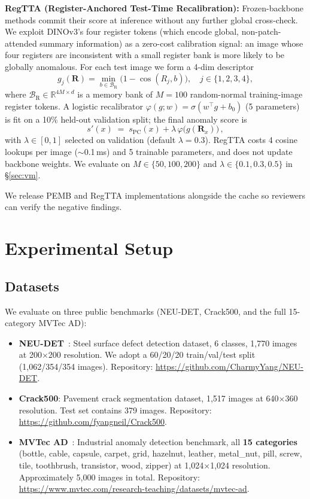 \documentclass[journal]{IEEEtran}
\begin{document}
\textbf{RegTTA (Register-Anchored Test-Time Recalibration):} Frozen-backbone methods commit their score at inference without any further global cross-check. We exploit DINOv3's four register tokens (which encode global, non-patch-attended summary information) as a zero-cost calibration signal: an image whose four registers are inconsistent with a small register bank is more likely to be globally anomalous. For each test image we form a 4-dim descriptor
\begin{equation}
g_j(\mathbf{R}) = \min_{b \in \mathcal{B}_{\mathrm{R}}} \bigl(1 - \cos(R_j, b)\bigr), \quad j \in \{1,2,3,4\},
\label{eq:regtta-desc}
\end{equation}
where $\mathcal{B}_{\mathrm{R}} \in \mathbb{R}^{4M \times d}$ is a memory bank of $M{=}100$ random-normal training-image register tokens. A logistic recalibrator $\varphi(g; w) = \sigma(w^{\top} g + b_0)$ (5 parameters) is fit on a 10\% held-out validation split; the final anomaly score is
\begin{equation}
s'(x) \;=\; s_{\text{PC}}(x) + \lambda \, \varphi\!\bigl(g(\mathbf{R}_x)\bigr)\,,
\label{eq:regtta-score}
\end{equation}
with $\lambda \in [0,1]$ selected on validation (default $\lambda{=}0.3$). RegTTA costs 4 cosine lookups per image ($\sim$0.1\,ms) and 5 trainable parameters, and does not update backbone weights. We evaluate on $M \in \{50,100,200\}$ and $\lambda \in \{0.1, 0.3, 0.5\}$ in \S\ref{sec:vm}.

We release PEMB and RegTTA implementations alongside the cache so reviewers can verify the negative findings.

\section{Experimental Setup}

\subsection{Datasets}
We evaluate on three public benchmarks (NEU-DET, Crack500, and the full 15-category MVTec AD):
\begin{itemize}\itemsep0pt
    \item \textbf{NEU-DET}~\cite{ref4,ref7}: Steel surface defect detection dataset, 6 classes, 1,770 images at 200$\times$200 resolution. We adopt a 60/20/20 train/val/test split (1,062/354/354 images). Repository: \url{https://github.com/CharmyYang/NEU-DET}.
    \item \textbf{Crack500}: Pavement crack segmentation dataset, 1,517 images at 640$\times$360 resolution. Test set contains 379 images. Repository: \url{https://github.com/fyangneil/Crack500}.
    \item \textbf{MVTec AD}~\cite{ref31}: Industrial anomaly detection benchmark, all \textbf{15 categories} (bottle, cable, capsule, carpet, grid, hazelnut, leather, metal\_nut, pill, screw, tile, toothbrush, transistor, wood, zipper) at 1,024$\times$1,024 resolution. Approximately 5,000 images in total. Repository: \url{https://www.mvtec.com/research-teaching/datasets/mvtec-ad}.
\end{itemize}
\end{document}
